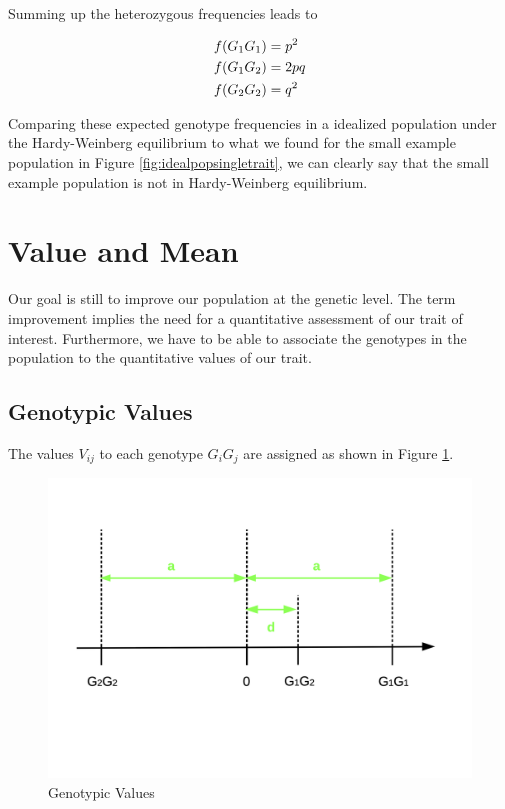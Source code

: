 \documentclass[]{book}
\theoremstyle{definition}
\theoremstyle{definition}
\theoremstyle{definition}
\theoremstyle{remark}
\begin{document}
Summing up the heterozygous frequencies leads to

\begin{align}
f(G_1G_1) &= p^2 \notag \\
f(G_1G_2) &= 2pq \notag \\
f(G_2G_2) &= q^2
\label{eq:genofreq}
\end{align}

Comparing these expected genotype frequencies in a idealized population under the Hardy-Weinberg equilibrium to what we found for the small example population in Figure \ref{fig:idealpopsingletrait}, we can clearly say that the small example population is not in Hardy-Weinberg equilibrium.

\hypertarget{value-mean}{%
\section{Value and Mean}\label{value-mean}}

Our goal is still to improve our population at the genetic level. The term improvement implies the need for a quantitative assessment of our trait of interest. Furthermore, we have to be able to associate the genotypes in the population to the quantitative values of our trait.

\hypertarget{geno-value}{%
\subsection{Genotypic Values}\label{geno-value}}

The values \(V_{ij}\) to each genotype \(G_iG_j\) are assigned as shown in Figure \ref{fig:genotypicvalue}.

\begin{figure}
\centering
\includegraphics{odg/genotypicvalue.png}
\caption{\label{fig:genotypicvalue}Genotypic Values}
\end{figure}
\end{document}
